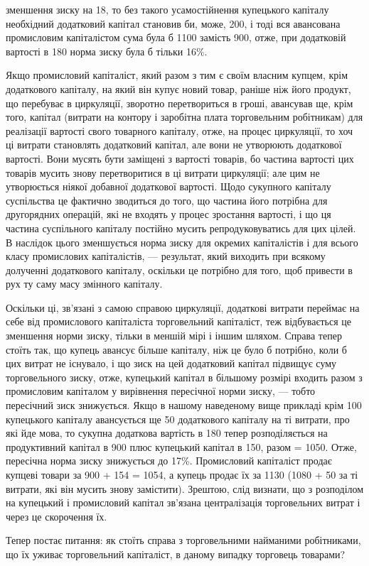 \parcont{}  %
зменшення зиску на 18, то без такого усамостійнення купецького
капіталу необхідний додатковий капітал становив би, може, 200,
і тоді вся авансована промисловим капіталістом сума була б 1100
замість 900, отже, при додатковій вартості в 180 норма зиску
була б тільки 16\%.

Якщо промисловий капіталіст, який разом з тим є своїм
власним купцем, крім додаткового капіталу, на який він купує
новий товар, раніше ніж його продукт, що перебуває в циркуляції,
зворотно перетвориться в гроші, авансував ще, крім того,
капітал (витрати на контору і заробітна плата торговельним
робітникам) для реалізації вартості свого товарного капіталу,
отже, на процес циркуляції, то хоч ці витрати становлять
додатковий капітал, але вони не утворюють додаткової вартості.
Вони мусять бути заміщені з вартості товарів, бо частина
вартості цих товарів мусить знову перетворитися в ці витрати
циркуляції; але цим не утворюється ніякої добавної додаткової
вартості. Щодо сукупного капіталу суспільства це фактично
зводиться до того, що частина його потрібна для другорядних
операцій, які не входять у процес зростання вартості, і що ця
частина суспільного капіталу постійно мусить репродуковуватись
для цих цілей. В наслідок цього зменшується норма зиску
для окремих капіталістів і для всього класу промислових капіталістів,
— результат, який виходить при всякому долученні
додаткового капіталу, оскільки це потрібно для того, щоб привести
в рух ту саму масу змінного капіталу.

Оскільки ці, зв’язані з самою справою циркуляції, додаткові
витрати переймає на себе від промислового капіталіста торговельний
капіталіст, теж відбувається це зменшення норми зиску,
тільки в меншій мірі і іншим шляхом. Справа тепер стоїть так,
що купець авансує більше капіталу, ніж це було б потрібно,
коли б цих витрат не існувало, і що зиск на цей додатковий
капітал підвищує суму торговельного зиску, отже, купецький
капітал в більшому розмірі входить разом з промисловим капіталом
у вирівнення пересічної норми зиску, — тобто пересічний
зиск знижується. Якщо в нашому наведеному вище прикладі крім
100 купецького капіталу авансується ще 50 додаткового капіталу
на ті витрати, про які йде мова, то сукупна додаткова
вартість в 180 тепер розподіляється на продуктивний капітал
в 900 плюс купецький капітал в 150, разом = 1050. Отже, пересічна
норма зиску знижується до 17\%. Промисловий капіталіст
продає купцеві товари за 900 + 154 = 1054, а купець
продає їх за 1130 (1080 + 50 за ті витрати, які він мусить знову
замістити). Зрештою, слід визнати, що з розподілом на купецький
і промисловий капітал зв’язана централізація торговельних
витрат і через це скорочення їх.

Тепер постає питання: як стоїть справа з торговельними
найманими робітниками, що їх уживає торговельний капіталіст,
в даному випадку торговець товарами?
